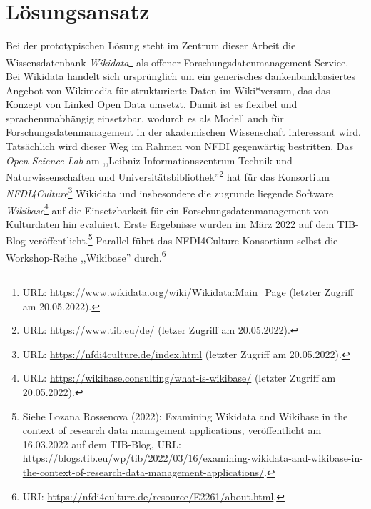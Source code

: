 \onehalfspacing

\section{Lösungsansatz}

Bei der prototypischen Lösung steht im Zentrum dieser Arbeit die Wissensdatenbank \textit{Wikidata}\footnote{URL: \url{https://www.wikidata.org/wiki/Wikidata:Main_Page} (letzter Zugriff am 20.05.2022).} als offener Forschungsdatenmanagement-Service. Bei Wikidata handelt sich ursprünglich um ein generisches dankenbankbasiertes Angebot von Wikimedia für strukturierte Daten im Wiki*versum, das das Konzept von Linked Open Data umsetzt. Damit ist es flexibel und sprachenunabhängig einsetzbar, wodurch es als Modell auch für Forschungsdatenmanagement in der akademischen Wissenschaft interessant wird. Tatsächlich wird dieser Weg im Rahmen von NFDI gegenwärtig bestritten. Das \textit{Open Science Lab} am ,,Leibniz-Informationszentrum Technik und Naturwissenschaften und Universitätsbibliothek''\footnote{URL: \url{https://www.tib.eu/de/} (letzer Zugriff am 20.05.2022).} hat für das Konsortium \textit{NFDI4Culture}\footnote{URL: \url{https://nfdi4culture.de/index.html} (letzter Zugriff am 20.05.2022).} Wikidata und insbesondere die zugrunde liegende Software \textit{Wikibase}\footnote{URL: \url{https://wikibase.consulting/what-is-wikibase/} (letzter Zugriff am 20.05.2022).} auf die Einsetzbarkeit für ein Forschungsdatenmanagement von Kulturdaten hin evaluiert. Erste Ergebnisse wurden im März 2022 auf dem TIB-Blog veröffentlicht.\footnote{Siehe Lozana Rossenova (2022): Examining Wikidata and Wikibase in the context of research data management applications, veröffentlicht am 16.03.2022 auf dem TIB-Blog, URL: \url{https://blogs.tib.eu/wp/tib/2022/03/16/examining-wikidata-and-wikibase-in-the-context-of-research-data-management-applications/}.} Parallel führt das NFDI4Culture-Konsortium selbst die Workshop-Reihe ,,Wikibase'' durch.\footnote{URI: \url{https://nfdi4culture.de/resource/E2261/about.html}.} 

